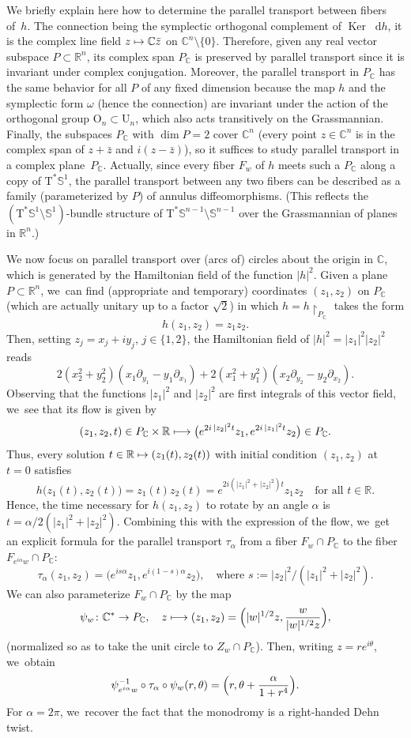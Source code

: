 \documentclass[10pt]{amsart}
\newcommand\mto{\mathchoice{\longmapsto}{\mapsto}{\mapsto}{\mapsto}}
\newcommand{\C}{{\mathbb C}}
\newcommand{\R}{{\mathbb R}}
\newcommand{\bS}{{\mathbb S}}
\renewcommand{\O}{{\mathrm{O}}}
\newcommand{\U}{{\mathrm{U}}}
\newcommand{\Ker}{\operatorname{Ker}}
\newcommand{\sT}{\mathrm{T}^\ast}
\renewcommand{\d}{\mathop{}\!\mathrm d}
\renewcommand{\dh}{\d h}
\newcommand{\de}{\mathrel{:=}}
\newcommand{\rst}[1]{{\upharpoonright}_{\!#1}}
\let\del\partial
\let\on\colon
\theoremstyle{plain}
\theoremstyle{definition}
\begin{document}
We briefly explain here how to determine the parallel transport between fibers
of~$h$. The connection being the symplectic orthogonal complement of $\Ker \dh$,
it is the complex line field $z \mto \C \bar z$ on $\C^n \setminus \{0\}$. Therefore,
given any real vector subspace $P \subset \R^n$, its complex span $P_\C$ is
preserved by parallel transport since it is invariant under complex conjugation.
Moreover, the parallel transport in $P_\C$ has the same behavior for all $P$ of
any fixed dimension because the map $h$ and the symplectic form $\omega$ (hence
the connection) are invariant under the action of the orthogonal group $\O_n
\subset \U_n$, which also acts transitively on the Grassmannian. Finally, the
subspaces $P_\C$ with $\dim P = 2$ cover $\C^n$ (every point $z \in \C^n$ is in
the complex span of $z + \bar z$ and $i (z - \bar z)$), so it suffices to study
parallel transport in a complex plane~$P_\C$. Actually, since every fiber $F_w$
of $h$ meets such a $P_\C$ along a copy of $\sT\bS^1$, the parallel transport
between any two fibers can be described as a family (parameterized by $P$) of
annulus diffeomorphisms. (This reflects the $(\sT\bS^1 \setminus \bS^1)$-bundle structure
of $\sT\bS^{n-1} \setminus \bS^{n-1}$ over the Grassmannian of planes in $\R^n$.)

We now focus on parallel transport over (arcs of) circles about the origin in
$\C$, which is generated by the Hamiltonian field of the function $|h|^2$. Given
a plane \hbox{$P \subset \R^n$}, we~can find (appropriate and temporary) coordinates
$(z_1,z_2)$ on $P_\C$ (which are actually unitary up to a factor $\sqrt2$) in
which $h = h \rst{ P_\C }$ takes the form
\[
h(z_1,z_2) = z_1z_2.
\]
Then, setting $z_j = x_j+iy_j$, $j \in \{1,2\}$, the Hamiltonian field of $|h|^2
= |z_1|^2 |z_2|^2$ reads
\[
2(x_2^2+y_2^2) (x_1 \del_{y_1} - y_1 \del_{x_1})
 + 2(x_1^2+y_1^2) (x_2 \del_{y_2} - y_2 \del_{x_2}).
\]
Observing that the functions $|z_1|^2$ and $|z_2|^2$ are first integrals of this
vector field, we~see that its flow is given by
\[
(z_1,z_2, t) \in P_\C \times \R \mto
 \bigl(e^{2i\,|z_2|^2t} z_1, e^{2i\,|z_1|^2t} z_2\bigr) \in P_\C.
\]
Thus, every solution $t \in \R \mto (z_1(t),z_2(t))$ with initial condition
$(z_1,z_2)$ at $t=0$ satisfies
\[
h \bigl(z_1(t),z_2(t)\bigr) = z_1(t) z_2(t)
 = e^{2i(|z_1|^2+|z_2|^2)t} z_1z_2 \quad \text{for all $t \in \R$.}
\]
Hence, the time necessary for $h(z_1,z_2)$ to rotate by an angle $\alpha$ is $t
= \alpha/2(|z_1|^2+|z_2|^2)$. Combining this with the expression of the flow, we~get an explicit formula for the parallel transport $\tau_\alpha$ from a fiber
$F_w \cap P_\C$ to the fiber $F_{e^{i\alpha}w} \cap P_\C$:
\[
\tau_\alpha (z_1,z_2) = \bigl(e^{is\alpha} z_1, e^{i(1-s)\alpha} z_2\bigr),
 \quad \text{where $s \de |z_2|^2 / (|z_1|^2+|z_2|^2)$.}
\]
We can also parameterize $F_w \cap P_\C$ by the map
\[
\psi_w \on \C^* \to P_\C, \quad
 z \mto (z_1,z_2) =
 \Bigl(|w|^{1/2} z, \frac{w}{|w|^{1/2} z}\Bigr),
\]
(normalized so as to take the unit circle to $Z_w \cap P_\C$). Then, writing $z
= re^{i\theta}$, we~obtain
\[
\psi_{e^{i\alpha}w}^{-1} \circ \tau_\alpha \circ \psi_w (r,\theta)
 = \Bigl(r, \theta + \frac{\alpha}{1+r^4}\Bigr).
\]
For $\alpha = 2\pi$, we~recover the fact that the monodromy is a right-handed
Dehn twist.
\end{document}
